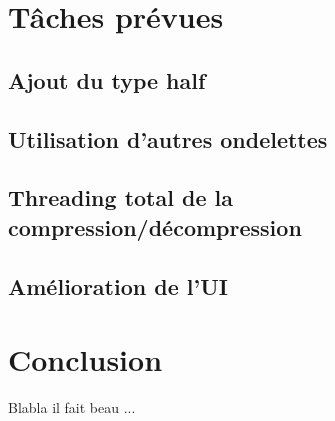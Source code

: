 \documentclass[a4paper,12pt]{article}
\begin{document}
\section{Tâches prévues}

	\subsection{Ajout du type half}

	\subsection{Utilisation d'autres ondelettes}

	\subsection{Threading total de la compression/décompression}

	\subsection{Amélioration de l'UI}

\newpage

\section*{Conclusion}
Blabla il fait beau ...
\end{document}

